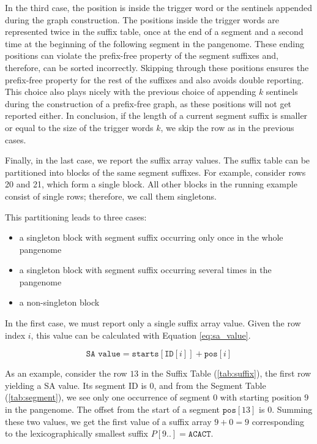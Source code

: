 In the third case, the position is inside the trigger word or the sentinels appended during the graph construction.
The positions inside the trigger words are represented twice in the suffix table, once at the end of a segment and a second time at the beginning of the following segment in the pangenome.
These ending positions can violate the prefix-free property of the segment suffixes and, therefore, can be sorted incorrectly.
Skipping through these positions ensures the prefix-free property for the rest of the suffixes and also avoids double reporting.
This choice also plays nicely with the previous choice of appending $k$ sentinels during the construction of a prefix-free graph, as these positions will not get reported either.
In conclusion, if the length of a current segment suffix is smaller or equal to the size of the trigger words $k$, we skip the row as in the previous cases.

Finally, in the last case, we report the suffix array values.
The suffix table can be partitioned into blocks of the same segment suffixes.
For example, consider rows 20 and 21, which form a single block.
All other blocks in the running example consist of single rows; therefore, we call them singletons.

This partitioning leads to three cases:
\begin{itemize}
    \item a singleton block with segment suffix occurring only once in the whole pangenome
    \item a singleton block with segment suffix occurring several times in the pangenome
    \item a non-singleton block
\end{itemize}

In the first case, we must report only a single suffix array value.
Given the row index $i$, this value can be calculated with Equation \ref{eq:sa_value}.

\begin{equation}
    \label{eq:sa_value}
    \texttt{SA value} = \texttt{starts}[\texttt{ID}[i]] + \texttt{pos}[i]
\end{equation}

As an example, consider the row $13$ in the Suffix Table (\ref{tab:suffix}), the first row yielding a SA value.
Its segment ID is $0$, and from the Segment Table (\ref{tab:segment}), we see only one occurrence of segment $0$ with starting position $9$ in the pangenome.
The offset from the start of a segment $\texttt{pos}[13]$ is $0$.
Summing these two values, we get the first value of a suffix array $9 + 0 = 9$ corresponding to the lexicographically smallest suffix $P[9..] = \texttt{ACACT}$.

